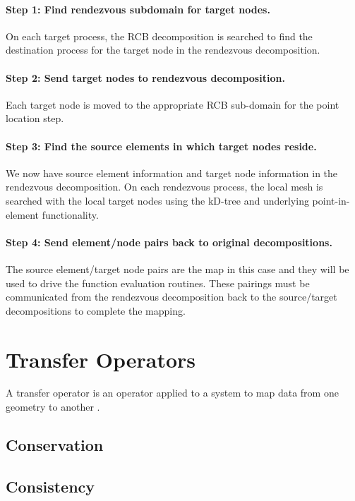 \documentclass[letterpaper,12pt]{article}
\begin{document}
\paragraph{Step 1: Find rendezvous subdomain for target nodes.}
On each target process, the RCB decomposition is searched to find the
destination process for the target node in the rendezvous
decomposition.

\paragraph{Step 2: Send target nodes to rendezvous decomposition.}
Each target node is moved to the appropriate RCB sub-domain for the
point location step.

\paragraph{Step 3: Find the source elements in which target nodes reside.}
We now have source element information and target node information in
the rendezvous decomposition. On each rendezvous process, the local
mesh is searched with the local target nodes using the kD-tree and
underlying point-in-element functionality.

\paragraph{Step 4: Send element/node pairs back to original
  decompositions.}  The source element/target node pairs are the map
in this case and they will be used to drive the function evaluation
routines. These pairings must be communicated from the rendezvous
decomposition back to the source/target decompositions to complete the
mapping.

\clearpage

\section{Transfer Operators}\label{sec:transfer}
A transfer operator is an operator applied to a system to map data
from one geometry to another \cite{LIME_2011}.

\subsection{Conservation}\label{subsec:conservation}

\subsection{Consistency}\label{subsec:consistency}
\end{document}
